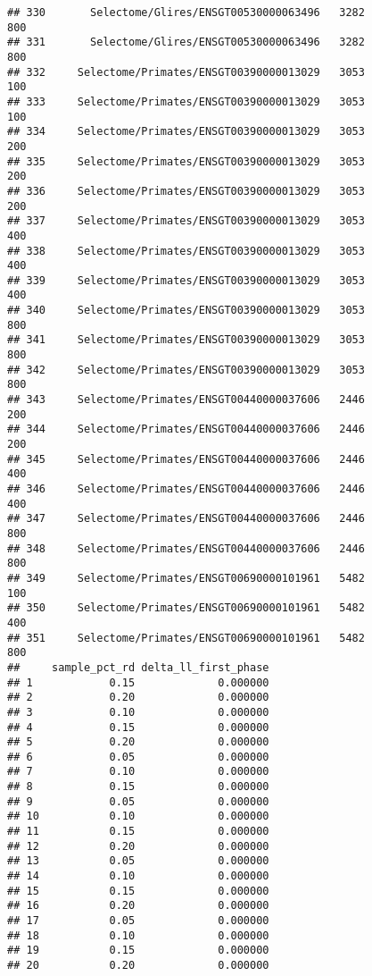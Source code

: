 \documentclass[
]{article}
\begin{document}
\begin{verbatim}
## 330       Selectome/Glires/ENSGT00530000063496   3282                   800
## 331       Selectome/Glires/ENSGT00530000063496   3282                   800
## 332     Selectome/Primates/ENSGT00390000013029   3053                   100
## 333     Selectome/Primates/ENSGT00390000013029   3053                   100
## 334     Selectome/Primates/ENSGT00390000013029   3053                   200
## 335     Selectome/Primates/ENSGT00390000013029   3053                   200
## 336     Selectome/Primates/ENSGT00390000013029   3053                   200
## 337     Selectome/Primates/ENSGT00390000013029   3053                   400
## 338     Selectome/Primates/ENSGT00390000013029   3053                   400
## 339     Selectome/Primates/ENSGT00390000013029   3053                   400
## 340     Selectome/Primates/ENSGT00390000013029   3053                   800
## 341     Selectome/Primates/ENSGT00390000013029   3053                   800
## 342     Selectome/Primates/ENSGT00390000013029   3053                   800
## 343     Selectome/Primates/ENSGT00440000037606   2446                   200
## 344     Selectome/Primates/ENSGT00440000037606   2446                   200
## 345     Selectome/Primates/ENSGT00440000037606   2446                   400
## 346     Selectome/Primates/ENSGT00440000037606   2446                   400
## 347     Selectome/Primates/ENSGT00440000037606   2446                   800
## 348     Selectome/Primates/ENSGT00440000037606   2446                   800
## 349     Selectome/Primates/ENSGT00690000101961   5482                   100
## 350     Selectome/Primates/ENSGT00690000101961   5482                   400
## 351     Selectome/Primates/ENSGT00690000101961   5482                   800
##     sample_pct_rd delta_ll_first_phase
## 1            0.15             0.000000
## 2            0.20             0.000000
## 3            0.10             0.000000
## 4            0.15             0.000000
## 5            0.20             0.000000
## 6            0.05             0.000000
## 7            0.10             0.000000
## 8            0.15             0.000000
## 9            0.05             0.000000
## 10           0.10             0.000000
## 11           0.15             0.000000
## 12           0.20             0.000000
## 13           0.05             0.000000
## 14           0.10             0.000000
## 15           0.15             0.000000
## 16           0.20             0.000000
## 17           0.05             0.000000
## 18           0.10             0.000000
## 19           0.15             0.000000
## 20           0.20             0.000000

\end{verbatim}
\end{document}
